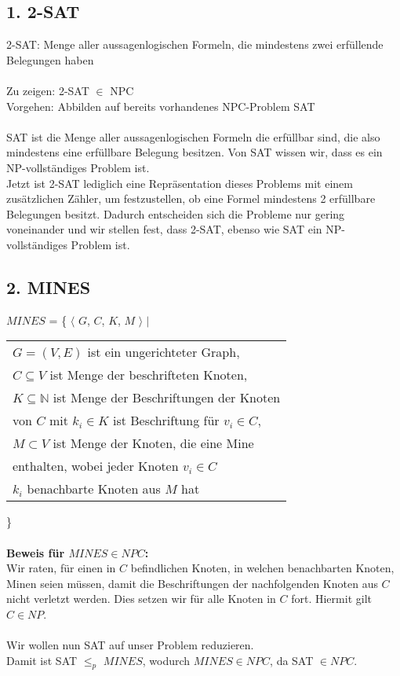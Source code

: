 \subsection*{1. 2-SAT}

2-SAT: Menge aller aussagenlogischen Formeln, die mindestens zwei erfüllende Belegungen haben \\\\
Zu zeigen: 2-SAT $\in$ NPC \\
Vorgehen: Abbilden auf bereits vorhandenes NPC-Problem SAT \\\\
SAT ist die Menge aller aussagenlogischen Formeln die erfüllbar sind, die also mindestens eine erfüllbare Belegung besitzen. Von SAT wissen wir, dass es ein NP-vollständiges Problem ist.\\
Jetzt ist 2-SAT lediglich eine Repräsentation dieses Problems mit einem zusätzlichen Zähler, um festzustellen, ob eine Formel mindestens 2 erfüllbare Belegungen besitzt. Dadurch entscheiden sich die Probleme nur gering voneinander und wir stellen fest, dass 2-SAT, ebenso wie SAT ein NP-vollständiges Problem ist.

\subsection*{2. MINES}
$MINES$ = \{ $\langle$ $G$, $C$, $K$, $M$ $\rangle \mid$
\begin{tabular}{l}
$G = (V,E)$ ist ein ungerichteter Graph,\\
$C \subseteq V$ ist Menge der beschrifteten Knoten,\\
$K \subseteq \mathbb{N}$ ist Menge der Beschriftungen der Knoten\\
von $C$ mit $k_i \in K$ ist Beschriftung für $v_i \in C$,\\
$M \subset V$ ist Menge der Knoten, die eine Mine\\
enthalten, wobei jeder Knoten $v_i \in C$\\
$k_i$ benachbarte Knoten aus $M$ hat
\end{tabular}\}\\\\
\textbf{Beweis für $MINES \in NPC$:}\\
Wir raten, für einen in $C$ befindlichen Knoten, in welchen benachbarten Knoten, Minen seien müssen, damit die Beschriftungen der nachfolgenden Knoten aus $C$ nicht verletzt werden. Dies setzen wir für alle Knoten in $C$ fort. Hiermit gilt $C \in NP$.\\\\
Wir wollen nun SAT auf unser Problem reduzieren.\\
Damit ist SAT $\leq_p$ $MINES$, wodurch $MINES \in NPC$, da SAT $\in NPC$. 